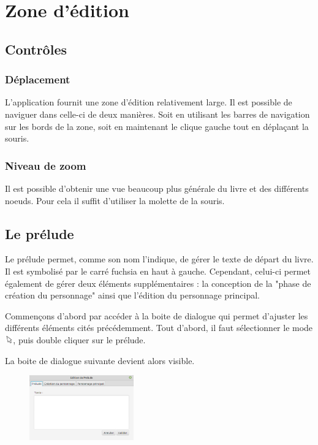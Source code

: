\chapter{Zone d'édition}

	\section{Contrôles}

		\subsection{Déplacement}

			L'application fournit une zone d'édition relativement large. Il est possible de naviguer dans celle-ci de deux manières. Soit en utilisant les barres de navigation sur les bords de la zone, soit en maintenant le clique gauche tout en déplaçant la souris.

		\subsection{Niveau de zoom}

			Il est possible d'obtenir une vue beaucoup plus générale du livre et des différents noeuds. Pour cela il suffit d'utiliser la molette de la souris.

	\section{Le prélude}

        Le prélude permet, comme son nom l'indique, de gérer le texte de départ du livre. Il est symbolisé par le carré fuchsia en haut à gauche. Cependant, celui-ci permet également de gérer deux éléments supplémentaires : la conception de la "phase de création du personnage" ainsi que l'édition du personnage principal.

		Commençons d'abord par accéder à la boite de dialogue qui permet d'ajuster les différents éléments cités précédemment. Tout d'abord, il faut sélectionner le mode \includegraphics[height=10pt, keepaspectratio]{img/icons/select.png}, puis double cliquer sur le prélude.

		La boite de dialogue suivante devient alors visible.

		\begin{figure}[H]
			\centering\includegraphics[width=0.4\textwidth, keepaspectratio]{img/prelude.png}
		\end{figure}

